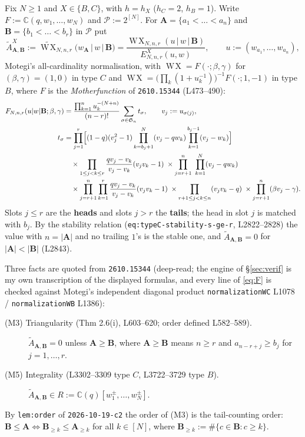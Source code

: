 \documentclass[11pt]{article}
\theoremstyle{plain}
\theoremstyle{definition}
\newcommand{\At}{\widetilde{A}}
\newcommand{\bA}{\mathbf{A}}
\newcommand{\bB}{\mathbf{B}}
\DeclareMathOperator{\WX}{W\!X}
\begin{document}
Fix $N\ge1$ and $X\in\{B,C\}$, with $h=h_X$ ($h_C=2$, $h_B=1$).  Write
$F:=\mathbb{C}(q,w_1,\dots,w_N)$ and $\mathcal{P}:=2^{[N]}$.  For
$\bA=\{a_1<\dots<a_n\}$ and $\bB=\{b_1<\dots<b_r\}$ in $\mathcal{P}$ put
\begin{equation}\label{eq:Adef}
  \At^{X}_{\bA,\bB}
  :=\widetilde{\WX}_{N,n,r}\bigl(w_{\bA}\,\big|\,w\,\big|\,\bB\bigr)
  =\frac{\WX_{N,n,r}(u\,|\,w\,|\,\bB)}{E^{X}_{N,n,r}(u,w)},
  \qquad u:=(w_{a_1},\dots,w_{a_n}),
\end{equation}
Motegi's all-cardinality normalisation, with
$\WX=F(\cdot;\beta,\gamma)$ for $(\beta,\gamma)=(1,0)$ in type $C$ and
$\WX=\bigl(\prod_{k}(1+u_k^{-1})\bigr)^{-1}F(\cdot;1,-1)$ in type $B$, where $F$
is the \emph{Motherfunction} of \texttt{2610.15344} (L473--490):
\begin{align}
  F_{N,n,r}(u|w|\bB;\beta,\gamma)
  &=\frac{\prod_{k=1}^{n}u_k^{-(N+n)}}{(n-r)!}
     \sum_{\sigma\in\mathfrak{S}_n}t_\sigma ,
     \qquad v_j:=u_{\sigma(j)},\label{eq:F}\\
  t_\sigma
  &=\prod_{j=1}^{r}\Bigl[(1-q)(v_j^{2}-1)
      \prod_{k=b_j+1}^{N}(v_j-qw_k)\prod_{k=1}^{b_j-1}(v_j-w_k)\Bigr]
    \notag\\
  &\quad\times\prod_{1\le j<k\le r}\frac{qv_j-v_k}{v_j-v_k}(v_jv_k-1)
    \;\times\prod_{j=r+1}^{n}\ \prod_{k=1}^{N}(v_j-qw_k)
    \notag\\
  &\quad\times\prod_{j=r+1}^{n}\prod_{k=1}^{r}\frac{qv_j-v_k}{v_j-v_k}(v_jv_k-1)
    \;\times\prod_{r+1\le j<k\le n}(v_jv_k-q)
    \;\times\prod_{j=r+1}^{n}(\beta v_j-\gamma).\notag
\end{align}
Slots $j\le r$ are the \textbf{heads} and slots $j>r$ the \textbf{tails}; the
head in slot $j$ is matched with $b_j$.  By the stability relation
(\texttt{eq:typeC-stability-s-ge-r}, L2822--2828) the value with $n=|\bA|$ and no
trailing $1$'s is the stable one, and $\At_{\bA,\bB}=0$ for $|\bA|<|\bB|$
(L2843).

Three facts are quoted from \texttt{2610.15344} (deep-read; the engine of
\S\ref{sec:verif} is my own transcription of the displayed formulas, and every
line of \eqref{eq:F} is checked against Motegi's independent diagonal product
\texttt{normalizationWC} L1078 / \texttt{normalizationWB} L1386):
\begin{description}
\item[(M3) Triangularity (Thm 2.6(i), L603--620; order defined L582--589).]
  $\At_{\bA,\bB}=0$ unless $\bA\ge\bB$, where $\bA\ge\bB$ means $n\ge r$ and
  $a_{n-r+j}\ge b_j$ for $j=1,\dots,r$.
\item[(M5) Integrality (L3302--3309 type $C$, L3722--3729 type $B$).]
  $\At_{\bA,\bB}\in R:=\mathbb{C}(q)[w_1^{\pm},\dots,w_N^{\pm}]$.
\end{description}
By \texttt{lem:order} of \texttt{2026-10-19-c2} the order of (M3) is the
tail-counting order: $\bB\le\bA\iff\bB_{\ge k}\le\bA_{\ge k}$ for all $k\in[N]$,
where $\bB_{\ge k}:=\#\{c\in\bB:c\ge k\}$.
\end{document}
